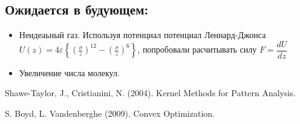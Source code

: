 \documentclass[twoside,twocolumn, 11pt]{article}
\theoremstyle{plain}
\theoremstyle{definition}
\begin{document}
\subsection{Ожидается в будующем:}
\begin{itemize}
\item Неидеаьный газ.
Используя потенциал потенциал Леннард-Джонса $ U(z)=4 \varepsilon\left\{\left(\frac{\sigma}{z}\right)^{12}-\left(\frac{\sigma}{z}\right)^{6}\right\}$, попробовали
расчитывать силу $F = \dfrac{dU}{dz}$
\item Увеличение числа молекул.
\end{itemize}


\begin{thebibliography}{99} %

Shawe-Taylor, J., Cristianini, N. (2004).
\newblock Kernel Methods for Pattern Analysis.

S. Boyd, L. Vandenberghe (2009).
\newblock Convex Optimization.

\end{thebibliography}

\end{document}
